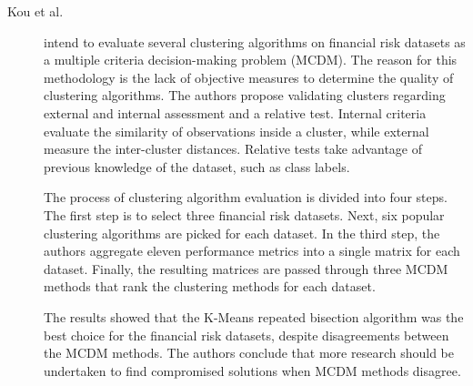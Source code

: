 \begin{description}
    \item[Kou et al.]\cite{Kou20141} intend to evaluate several clustering algorithms on financial risk datasets as a multiple criteria decision-making problem (MCDM). The reason for this methodology is the lack of objective measures to determine the quality of clustering algorithms. The authors propose validating clusters regarding external and internal assessment and a relative test. Internal criteria evaluate the similarity of observations inside a cluster, while external measure the inter-cluster distances. Relative tests take advantage of previous knowledge of the dataset, such as class labels.
    
    The process of clustering algorithm evaluation is divided into four steps. The first step is to select three financial risk datasets. Next, six popular clustering algorithms are picked for each dataset. In the third step, the authors aggregate eleven performance metrics into a single matrix for each dataset. Finally, the resulting matrices are passed through three MCDM methods that rank the clustering methods for each dataset.

    The results showed that the K-Means repeated bisection algorithm was the best choice for the financial risk datasets, despite disagreements between the MCDM methods. The authors conclude that more research should be undertaken to find compromised solutions when MCDM methods disagree.
\end{description}


